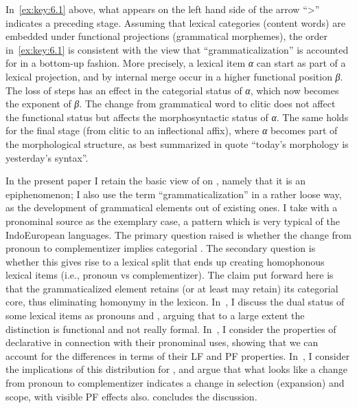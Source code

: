 \documentclass[output=paper]{langsci/langscibook}
\begin{document}
In~\eqref{ex:key:6.1} above, what appears on the left hand side of the arrow
“>” indicates a preceding stage. Assuming that lexical categories (content
words) are embedded under functional projections (grammatical morphemes), the
order in~\eqref{ex:key:6.1} is consistent with the view that
\enquote{grammaticalization} is accounted for in a
bottom-up fashion. More precisely, a lexical item \emph{α} can start as part of
a lexical projection, and by internal merge occur in a higher functional
position \emph{β}. The loss of  steps has an effect in the categorial
status of \emph{α}, which now becomes the exponent of \emph{β}. The change from
grammatical word to clitic does not affect the functional status but affects
the morphosyntactic status of \emph{α}. The same holds for the final stage
(from clitic to an inflectional affix), where \emph{α} becomes part of the
morphological structure, as best summarized in  quote
\enquote{today’s morphology is yesterday’s syntax}.

In the present paper I retain the basic view of \citet{RobRou2003} on
, namely that it is an epiphenomenon; I also use the
term \enquote{grammaticalization} in a rather loose way, as the development of
grammatical elements out of existing ones. I take  with a
pronominal source as the exemplary case, a pattern which is very typical of the
Indo\-Eu\-ro\-pean languages. The primary question raised is whether the change
from pronoun to complementizer implies categorial
. The secondary question is whether this  gives
rise to a lexical split that ends up creating homophonous lexical items (i.e.,
pronoun vs complementizer). The claim put forward here is that the
grammaticalized element retains (or at least may retain) its categorial core,
thus eliminating homonymy in the lexicon.  In~, I discuss
the dual status of some lexical items as pronouns and ,
arguing that to a large extent the distinction is functional and not really
formal. In~, I consider the properties of 
declarative  in connection with their pronominal uses,
showing that we can account for the differences in terms of their \gls{LF} and
\gls{PF} properties. In~, I consider the implications of
this distribution for , and argue that what looks like
a change from pronoun to complementizer indicates a change
in selection (expansion) and scope, with visible \gls{PF} effects also.
 concludes the discussion.
\end{document}
